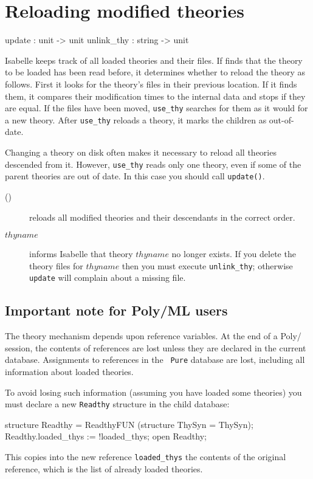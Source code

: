 \section{Reloading modified theories}
\begin{ttbox} 
update     : unit -> unit
unlink_thy : string -> unit
\end{ttbox}
Isabelle keeps track of all loaded theories and their files.  If
 finds that the theory to be loaded has been read before,
it determines whether to reload the theory as follows.  First it looks for
the theory's files in their previous location.  If it finds them, it
compares their modification times to the internal data and stops if they
are equal.  If the files have been moved, {\tt use_thy} searches for them
as it would for a new theory.  After {\tt use_thy} reloads a theory, it
marks the children as out-of-date.
\begin{warn}
  Changing a theory on disk often makes it necessary to reload all theories
  descended from it.  However, {\tt use_thy} reads only one theory, even if
  some of the parent theories are out of date.  In this case you should
  call {\tt update()}.
\end{warn}

\begin{description}
\item[ ()] 
  reloads all modified theories and their descendants in the correct order.  

\item[ $thyname$]
  informs Isabelle that theory $thyname$ no longer exists.  If you delete the
  theory files for $thyname$ then you must execute {\tt unlink_thy};
  otherwise {\tt update} will complain about a missing file.
\end{description}


\subsection{Important note for Poly/ML users}
The theory mechanism depends upon reference variables.  At the end of a
Poly/\ML{} session, the contents of references are lost unless they are
declared in the current database.  Assignments to references in the {\tt
  Pure} database are lost, including all information about loaded theories.

To avoid losing such information (assuming you have loaded some theories)
you must declare a new {\tt Readthy} structure in the child database:
\begin{ttbox}
structure Readthy = ReadthyFUN (structure ThySyn = ThySyn);
Readthy.loaded_thys := !loaded_thys;
open Readthy;
\end{ttbox}
This copies into the new reference \verb$loaded_thys$ the contents of the
original reference, which is the list of already loaded theories.


